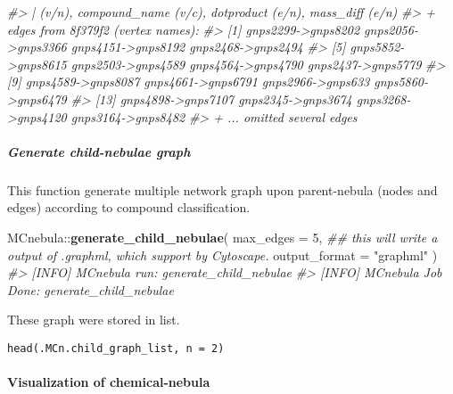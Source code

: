 \documentclass[]{tufte-handout}
\newenvironment{Shaded}{}{}
\newcommand{\CommentTok}[1]{\textcolor[rgb]{0.38,0.63,0.69}{\textit{#1}}}
\newcommand{\DataTypeTok}[1]{\textcolor[rgb]{0.56,0.13,0.00}{#1}}
\newcommand{\DecValTok}[1]{\textcolor[rgb]{0.25,0.63,0.44}{#1}}
\newcommand{\KeywordTok}[1]{\textcolor[rgb]{0.00,0.44,0.13}{\textbf{#1}}}
\newcommand{\NormalTok}[1]{#1}
\newcommand{\OperatorTok}[1]{\textcolor[rgb]{0.40,0.40,0.40}{#1}}
\newcommand{\StringTok}[1]{\textcolor[rgb]{0.25,0.44,0.63}{#1}}
\begin{document}
\begin{Shaded}
\begin{Highlighting}[]
\CommentTok{\#\textgreater{} | (v/n), compound\_name (v/c), dotproduct (e/n), mass\_diff (e/n)}
\CommentTok{\#\textgreater{} + edges from 8f379f2 (vertex names):}
\CommentTok{\#\textgreater{}  [1] gnps2299{-}\textgreater{}gnps8202 gnps2056{-}\textgreater{}gnps3366 gnps4151{-}\textgreater{}gnps8192 gnps2468{-}\textgreater{}gnps2494}
\CommentTok{\#\textgreater{}  [5] gnps5852{-}\textgreater{}gnps8615 gnps2503{-}\textgreater{}gnps4589 gnps4564{-}\textgreater{}gnps4790 gnps2437{-}\textgreater{}gnps5779}
\CommentTok{\#\textgreater{}  [9] gnps4589{-}\textgreater{}gnps8087 gnps4661{-}\textgreater{}gnps6791 gnps2966{-}\textgreater{}gnps633  gnps5860{-}\textgreater{}gnps6479}
\CommentTok{\#\textgreater{} [13] gnps4898{-}\textgreater{}gnps7107 gnps2345{-}\textgreater{}gnps3674 gnps3268{-}\textgreater{}gnps4120 gnps3164{-}\textgreater{}gnps8482}
\CommentTok{\#\textgreater{} + ... omitted several edges}
\end{Highlighting}
\end{Shaded}

\hypertarget{generate-child-nebulae-graph}{%
\subparagraph{Generate child-nebulae
graph}\label{generate-child-nebulae-graph}}

This function generate multiple network graph upon parent-nebula (nodes
and edges) according to compound classification.

\begin{Shaded}
\begin{Highlighting}[]
\NormalTok{MCnebula}\OperatorTok{::}\KeywordTok{generate\_child\_nebulae}\NormalTok{(}
  \DataTypeTok{max\_edges =} \DecValTok{5}\NormalTok{,}
  \CommentTok{\#\# this will write a output of .graphml, which support by Cytoscape.}
  \DataTypeTok{output\_format =} \StringTok{"graphml"}
\NormalTok{)}
\CommentTok{\#\textgreater{} [INFO] MCnebula run: generate\_child\_nebulae}
\CommentTok{\#\textgreater{} [INFO] MCnebula Job Done: generate\_child\_nebulae}
\end{Highlighting}
\end{Shaded}

These graph were stored in list.

\begin{verbatim}
head(.MCn.child_graph_list, n = 2)
\end{verbatim}

\hypertarget{visualization-of-chemical-nebula}{%
\paragraph{Visualization of
chemical-nebula}\label{visualization-of-chemical-nebula}}
\end{document}
